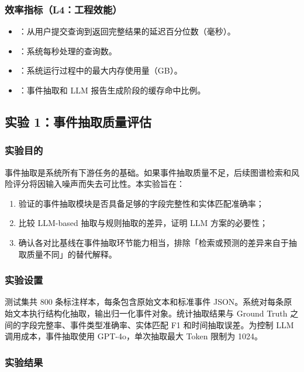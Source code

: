 \subsubsection{效率指标（L4：工程效能）}

\begin{itemize}
    \item {}：从用户提交查询到返回完整结果的延迟百分位数（毫秒）。
    \item {}：系统每秒处理的查询数。
    \item {}：系统运行过程中的最大内存使用量（GB）。
    \item {}：事件抽取和 LLM 报告生成阶段的缓存命中比例。
\end{itemize}

\subsection{实验 1：事件抽取质量评估}
\label{sec:exp-extraction}

\subsubsection{实验目的}

事件抽取是系统所有下游任务的基础。如果事件抽取质量不足，后续图谱检索和风险评分将因输入噪声而失去可比性。本实验旨在：
\begin{enumerate}
    \item 验证\projectshort 的事件抽取模块是否具备足够的字段完整性和实体匹配准确率；
    \item 比较 LLM-based 抽取与规则抽取的差异，证明 LLM 方案的必要性；
    \item 确认各对比基线在事件抽取环节能力相当，排除「检索或预测的差异来自于抽取质量不同」的替代解释。
\end{enumerate}

\subsubsection{实验设置}

测试集共 800 条标注样本，每条包含原始文本和标准事件 JSON。系统对每条原始文本执行结构化抽取，输出归一化事件对象。统计抽取结果与 Ground Truth 之间的字段完整率、事件类型准确率、实体匹配 F1 和时间抽取误差。为控制 LLM 调用成本，事件抽取使用 GPT-4o，单次抽取最大 Token 限制为 1024。

\subsubsection{实验结果}

